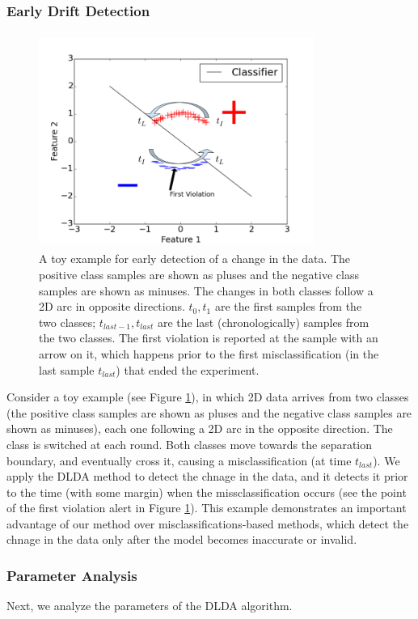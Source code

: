 \documentclass{vldb}
\begin{document}
\subsubsection{Early Drift Detection}\label{sec:earlydetection}
\begin{figure}[ht]
	\centering
	\includegraphics[width=90mm, height=7cm]{graphics/EarlyDetection.png}
	\caption{A toy example for early detection of a change in the data. The
	positive class samples are shown as pluses and the negative class samples are shown as minuses. The changes in both classes follow a 2D arc in opposite directions. $t_0, t_1$ are the first samples from the two classes; $t_{last-1}, t_{last}$ are the last (chronologically) samples from the two classes. The first violation is reported at the sample with an arrow on it, which happens prior to the first misclassification (in the  last sample $t_{last}$) that ended the experiment.}
	\label{EarlyDetection}
\end{figure}
Consider a toy example (see Figure \ref{EarlyDetection}), 
in which 2D data arrives from two classes (the positive class samples are shown as pluses and 
the negative class samples are shown as minuses), each one following a 2D arc in the opposite 
direction. 
The class is switched at each round. 
Both classes move towards the separation boundary, 
and eventually cross it, causing a misclassification (at time $t_{last}$). 
We apply the DLDA method to detect the chnage in the data, and it detects it
prior to the time (with some margin) when the missclassification occurs 
(see the point of the first violation alert in Figure \ref{EarlyDetection}). 
This example demonstrates an important advantage of our method over misclassifications-based 
methods, which detect the chnage in the data only after the model becomes inaccurate or invalid.

\subsubsection{Parameter Analysis}\label{sec:paramanal}
Next, we analyze the parameters of the DLDA algorithm.
\end{document}
